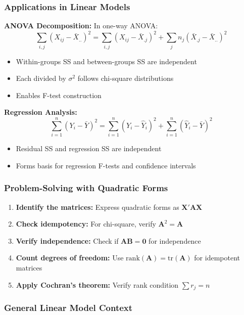 \subsubsection{Applications in Linear Models}

\textbf{ANOVA Decomposition:}
In one-way ANOVA:
\[
\sum_{i,j}(X_{ij} - \bar{X}_{..})^2 = \sum_{i,j}(X_{ij} - \bar{X}_{.j})^2 + \sum_j n_j(\bar{X}_{.j} - \bar{X}_{..})^2
\]

\begin{itemize}
	\item Within-groups SS and between-groups SS are independent
	\item Each divided by $\sigma^2$ follows chi-square distributions
	\item Enables F-test construction
\end{itemize}

\textbf{Regression Analysis:}
\[
\sum_{i=1}^n (Y_i - \bar{Y})^2 = \sum_{i=1}^n (Y_i - \hat{Y}_i)^2 + \sum_{i=1}^n (\hat{Y}_i - \bar{Y})^2
\]

\begin{itemize}
	\item Residual SS and regression SS are independent
	\item Forms basis for regression F-tests and confidence intervals
\end{itemize}

\subsubsection{Problem-Solving with Quadratic Forms}

\begin{enumerate}
	\item \textbf{Identify the matrices:} Express quadratic forms as $\mathbf{X}'\mathbf{A}\mathbf{X}$
	\item \textbf{Check idempotency:} For chi-square, verify $\mathbf{A}^2 = \mathbf{A}$
	\item \textbf{Verify independence:} Check if $\mathbf{AB} = \mathbf{0}$ for independence
	\item \textbf{Count degrees of freedom:} Use $\text{rank}(\mathbf{A}) = \text{tr}(\mathbf{A})$ for idempotent matrices
	\item \textbf{Apply Cochran's theorem:} Verify rank condition $\sum r_j = n$
\end{enumerate}

\subsubsection{General Linear Model Context}

